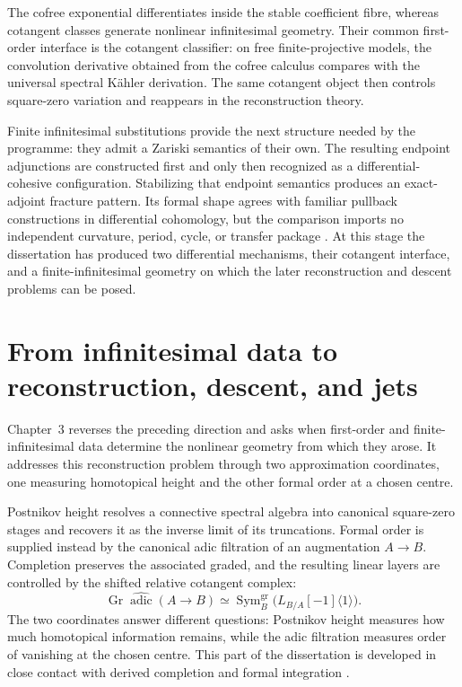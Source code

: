 The cofree exponential differentiates inside the stable coefficient fibre,
whereas cotangent classes generate nonlinear infinitesimal geometry.  Their
common first-order interface is the cotangent classifier: on free
finite-projective models, the convolution derivative obtained from the
cofree calculus compares with the universal spectral K\"ahler derivation.
The same cotangent object then controls square-zero variation and reappears in
the reconstruction theory.

Finite infinitesimal substitutions provide the next structure needed by the
programme: they admit a Zariski semantics of their own.  The resulting
endpoint adjunctions are constructed first and only then recognized as a
differential-cohesive configuration.  Stabilizing that endpoint semantics
produces an exact-adjoint fracture pattern.  Its formal shape agrees with
familiar pullback constructions in differential cohomology, but the
comparison imports no independent curvature, period, cycle, or transfer
package
\cite{HopkinsSinger2005,BNV2016}.  At this stage the dissertation has
produced two differential mechanisms, their cotangent interface, and a
finite-infinitesimal geometry on which the later reconstruction and descent
problems can be posed.


\section{From infinitesimal data to reconstruction, descent, and jets}
\label{sec:intro-architecture}

Chapter~3 reverses the preceding direction and asks when first-order and
finite-infinitesimal data determine the nonlinear geometry from which they
arose.  It addresses this reconstruction problem through two approximation
coordinates, one measuring homotopical height and the other formal order at a
chosen centre.

Postnikov height resolves a connective spectral algebra into canonical
square-zero stages and recovers it as the inverse limit of its truncations.
Formal order is supplied instead by the canonical adic filtration of an
augmentation \(A\to B\).  Completion preserves the associated graded, and
the resulting linear layers are controlled by the shifted relative cotangent
complex:
\[
    \operatorname{Gr}
    \widehat{\operatorname{adic}}(A\to B)
    \simeq
    \operatorname{Sym}^{\mathrm{gr}}_B
    \bigl(L_{B/A}[-1]\langle1\rangle\bigr).
\]
The two coordinates answer different questions: Postnikov height
measures how much homotopical information remains, while the adic filtration
measures order of vanishing at the chosen centre.  This part of the
dissertation is developed in close contact with derived completion and formal
integration
\cite{BhattCompletionsDerivedDeRham,AntieauFiltrationsCohomologyIII2025,BrantnerMagidsonNuitenFormalIntegration}.

